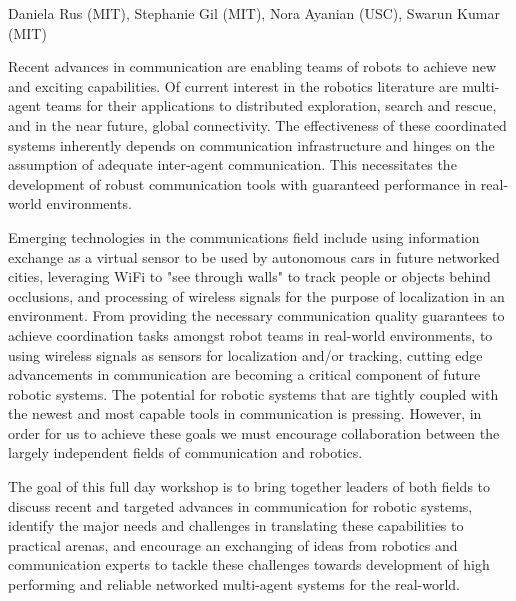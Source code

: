 \begin{spacing}{1.0}
{Daniela Rus (MIT), Stephanie Gil (MIT), Nora Ayanian (USC), Swarun Kumar (MIT)}
{
Recent advances in communication are enabling teams of robots to achieve new and exciting capabilities. Of current interest in the robotics literature are multi-agent teams for their applications to distributed exploration, search and rescue, and in the near future, global connectivity. The effectiveness of these coordinated systems inherently depends on communication infrastructure and hinges on the assumption of adequate inter-agent communication. This necessitates the development of robust communication tools with guaranteed performance in real-world environments.

Emerging technologies in the communications field include using information exchange as a virtual sensor to be used by autonomous cars in future networked cities, leveraging WiFi to "see through walls" to track people or objects behind occlusions, and processing of wireless signals for the purpose of localization in an environment. From providing the necessary communication quality guarantees to achieve coordination tasks amongst robot teams in real-world environments, to using wireless signals as sensors for localization and/or tracking, cutting edge advancements in communication are becoming a critical component of future robotic systems. The potential for robotic systems that are tightly coupled with the newest and most capable tools in communication is pressing. However, in order for us to achieve these goals we must encourage collaboration between the largely independent fields of communication and robotics.

The goal of this full day workshop is to bring together leaders of both fields to discuss recent and targeted advances in communication for robotic systems, identify the major needs and challenges in translating these capabilities to practical arenas, and encourage an exchanging of ideas from robotics and communication experts to tackle these challenges towards development of high performing and reliable networked multi-agent systems for the real-world.
}




\end{spacing}
